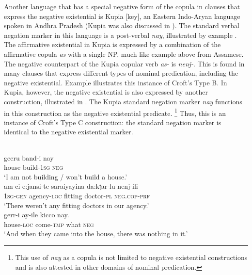 ﻿\documentclass[output=paper]{langsci/langscibook}
\begin{document}
Another language that has a special negative form of the copula in clauses
that express the negative existential is Kupia [key], an Eastern
Indo-Aryan language spoken in Andhra Pradesh (Kupia was also discussed in
).  The standard verbal negation marker in this language is a
post-verbal \textit{nay}, illustrated by example
. The affirmative existential in Kupia is
expressed by a combination of the affirmative copula \textit{as} with a
single NP, much like example  above from
Assamese. The negative counterpart of the Kupia copular verb
\textit{as-} is \textit{nenj-}. This is found in many clauses that express
different types of nominal predication, including the negative existential.
Example  illustrates this instance of Croft's
Type B. In Kupia, however, the negative existential is also
expressed by another construction, illustrated in
. The Kupia standard negation
marker \textit{nay} functions in this construction as the negative
existential predicate.%
%
\footnote{This use of \textit{nay} as a copula is not
limited to negative existential constructions and is also attested in other
domains of nominal predication.} 
%
Thus, this is an instance of Croft's Type C construction: the standard
negation marker is identical to the negative existential marker. 
%
\begin{exe}\ex
\begin{xlist}
    \ex\label{ex:ieur-kupia-buildhouse}
\\
    \gll geeru band-i nay \\
house build-\textsc{1sg} \textsc{neg} \\
    \glt `I am not building / won't build a house.'
\ex\label{ex:ieur-kupia-agency}
  \\
\gll am-ci e:jansi-te saraiyayina da:kʈar-lu   nenj-ili\\
\textsc{1sg}-\textsc{gen} agency-\textsc{loc} fitting doctor-\textsc{pl}
\textsc{neg.cop-prf}\\
\glt `There weren't any fitting doctors in our agency.'
\ex\label{ex:ieur-kupia-emptyhouse}
\\
\gll gerr-i ay-ile kicco nay.\\
house-\textsc{loc} come-\textsc{tmp}   what   \textsc{neg}\\
\glt `And when they came into the house, there was nothing in it.'
\end{xlist}\end{exe}
\end{document}
